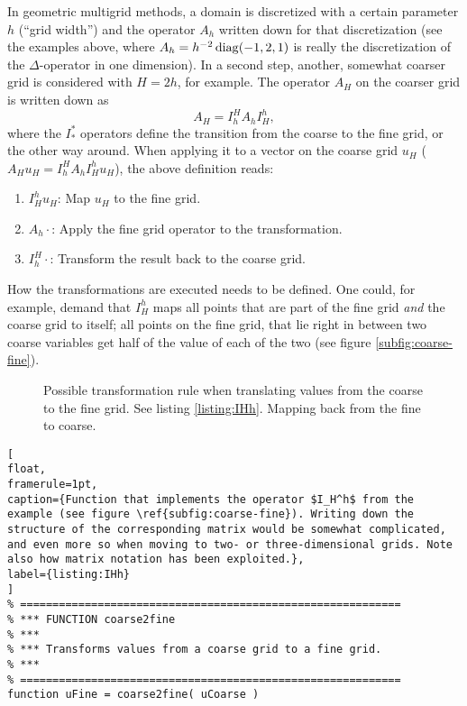 \begin{example}[Multigrid]
In geometric multigrid methods, a domain is discretized with a certain parameter $h$ (``grid width'') and the operator $A_h$ written down for that discretization (see the examples above, where $A_h=h^{-2}\operatorname{diag}(-1,2,1)$ is really the discretization of the $\Delta$-operator in one dimension). In a second step, another, somewhat coarser grid is considered with $H=2h$, for example. The operator $A_H$ on the coarser grid is written down as
\[
A_H = I_h^H A_h I_H^h,
\]
where the $I_*^*$ operators define the transition from the coarse to the fine grid, or the other way around. When applying it to a vector on the coarse grid $u_H$ ($A_Hu_H =I_h^H A_h I_H^h u_H$), the above definition reads:
\begin{enumerate}
\item $I_H^h u_H$: Map $u_H$ to the fine grid.
\item $A_h\cdot$: Apply the fine grid operator to the transformation.
\item $I_h^H\cdot$: Transform the result back to the coarse grid.
\end{enumerate}
How the transformations are executed needs to be defined. One could, for example, demand that $I_H^h$ maps all points that are part of the fine grid \emph{and} the coarse grid to itself; all points on the fine grid, that lie right in between two coarse variables get half of the value of each of the two (see figure \ref{subfig:coarse-fine}).

\begin{figure}
\hfill
\subfloat[][]{\label{subfig:coarse-fine}}
\hfill
\subfloat[][]{\label{subfig:fine-coarse}}
\hfill

\caption{ Possible transformation rule when translating values from the coarse to the fine grid. See listing \ref{listing:IHh}.  Mapping back from the fine to coarse.}
\end{figure}


\begin{lstlisting}[
float,
framerule=1pt,
caption={Function that implements the operator $I_H^h$ from the example (see figure \ref{subfig:coarse-fine}). Writing down the structure of the corresponding matrix would be somewhat complicated, and even more so when moving to two- or three-dimensional grids. Note also how matrix notation has been exploited.},
label={listing:IHh}
]
% ===========================================================
% *** FUNCTION coarse2fine
% ***
% *** Transforms values from a coarse grid to a fine grid.
% ***
% ===========================================================
function uFine = coarse2fine( uCoarse )


\end{lstlisting}
\end{example}
